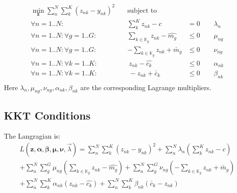 \documentclass[11 pt]{article}
\begin{document}
\begin{equation} \label{batch_nested_qp}
    \begin{aligned}
        \underset{\bm{z}}{\min} \sum_n^N \sum_k^K (z_{nk} - y_{nk})^2 \quad &\text{subject to} \\
        \forall n=1..N: & \sum_k^K z_{nk} - c &= 0                   \qquad \lambda_n\\
        \forall n=1..N: \forall g=1..G: & \sum_{k \in \mathbb{K}_g} z_{nk} - \hat{m_{g}} &\le 0 \qquad \mu_{ng} \\
        \forall n=1..N: \forall g=1..G: & -\sum_{k \in \mathbb{K}_g} z_{nk} + \check{m_{g}} &\le 0 \qquad \nu_{ng} \\
        \forall n=1..N: \forall k=1..K: & \ z_{nk} - \hat{c_{k}} &\le 0      \qquad \alpha_{nk}\\
        \forall n=1..N: \forall k=1..K : & \ -z_{nk} + \check{c_{k}} &\le 0 \qquad \beta_{nk}\\
    \end{aligned}
\end{equation}
Here $\lambda_n, \mu_{ng}, \nu_{ng}, \alpha_{nk}, \beta_{nk}$ are the corresponding Lagrange multipliers.


\subsection{KKT Conditions}

The Langragian is:
\begin{multline}
    L(\bm{z},\bm{\alpha},\bm{\beta},\bm{\mu},\bm{\nu},\vec{\lambda}) = \sum_n^N \sum_k^K (z_{nk}-y_{nk})^2 + \sum_n^N \lambda_n (\sum_k^K z_{nk} - c) \\
    + \sum_n^N \sum_g^G \mu_{ng}(\sum_{k \in \mathbb{K}_g} z_{nk} - \hat{m_{g}})
    + \sum_n^N \sum_g^G \nu_{ng}(-\sum_{k \in \mathbb{K}_g} z_{nk} + \check{m_{g}}) \\
    + \sum_n^N \sum_k^K \alpha_{nk}(z_{nk} - \hat{c_k}) + \sum_n^N \sum_k^K \beta_{nk}(\check{c_k} - z_{nk})
\end{multline}
\end{document}
